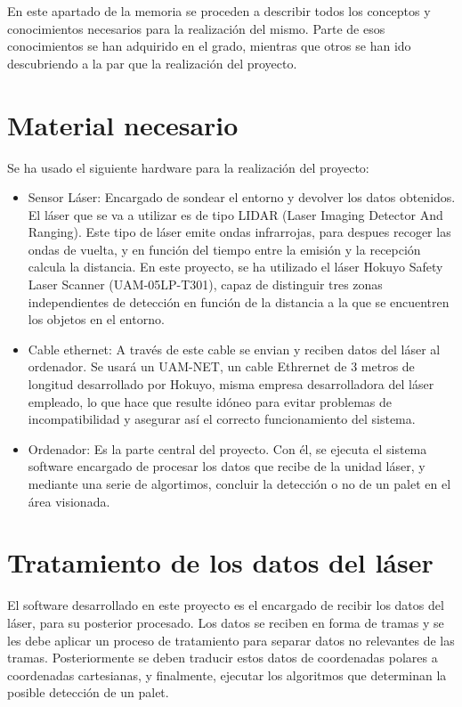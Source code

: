 
En este apartado de la memoria se proceden a describir todos los conceptos y conocimientos necesarios para la realización del mismo. Parte de esos conocimientos se han adquirido en el grado, mientras que otros se han ido descubriendo a la par que la realización del proyecto.



\section{Material necesario}

Se ha usado el siguiente hardware para la realización del proyecto:
\begin{itemize}
	\item Sensor Láser: Encargado de sondear el entorno y devolver los datos obtenidos. El láser que se va a utilizar es de tipo LIDAR (Laser Imaging Detector And Ranging).
Este tipo de láser emite ondas infrarrojas, para despues recoger las ondas de vuelta, y en función del tiempo entre la emisión y la recepción calcula la distancia.
En este proyecto, se ha utilizado el láser Hokuyo Safety Laser Scanner (UAM-05LP-T301), capaz de distinguir tres zonas independientes de detección en función de la distancia a la que se encuentren los objetos en el entorno.
	\item Cable ethernet: A través de este cable se envian y reciben datos del láser al ordenador. Se usará un UAM-NET, un cable Ethrernet de 3 metros de longitud desarrollado por Hokuyo, misma empresa desarrolladora del láser empleado, lo que hace que resulte idóneo para evitar problemas de incompatibilidad y asegurar así el correcto funcionamiento del sistema.
	\item Ordenador: Es la parte central del proyecto. Con él, se ejecuta el sistema software encargado de procesar los datos que recibe de la unidad láser, y mediante una serie de algortimos, concluir la detección o no de un palet en el área visionada.
\end{itemize}

\section{Tratamiento de los datos del láser}
El software desarrollado en este proyecto es el encargado de recibir los datos del láser, para su posterior procesado. Los datos se reciben en forma de tramas y se les debe aplicar un proceso de tratamiento para separar datos no relevantes de las tramas. Posteriormente se deben traducir estos datos de coordenadas polares a coordenadas cartesianas, y finalmente, ejecutar los algoritmos que determinan la posible detección de un palet.

